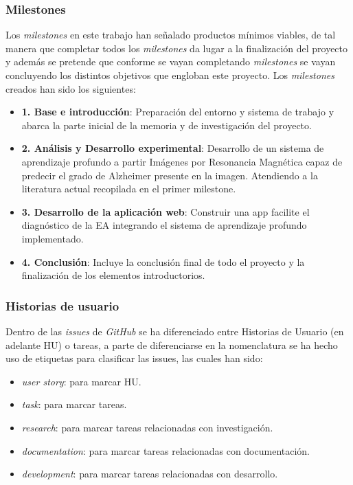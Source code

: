 \subsubsection{Milestones}
Los \textit{milestones} en este trabajo han señalado productos mínimos viables, de tal manera que completar todos los
\textit{milestones} da lugar a la finalización del proyecto y además se pretende que conforme se vayan completando
\textit{milestones} se vayan concluyendo los distintos objetivos que engloban este proyecto.
Los \textit{milestones} creados han sido los siguientes:
\begin{itemize}
    \item  \textbf{1. Base e introducción}: Preparación del entorno y sistema de trabajo y abarca la parte inicial de la
    memoria y de investigación del proyecto.
    \item \textbf{2. Análisis y Desarrollo experimental}: Desarrollo de un sistema de aprendizaje profundo a partir
    Imágenes por Resonancia Magnética capaz de predecir el grado de Alzheimer presente en la imagen.
    Atendiendo a la literatura actual recopilada en el primer milestone.
    \item \textbf{3. Desarrollo de la aplicación web}: Construir una app facilite  el diagnóstico de la EA integrando el
    sistema de aprendizaje profundo implementado.
    \item \textbf{4. Conclusión}: Incluye la conclusión final de todo el proyecto y la finalización de los elementos
    introductorios.\\
\end{itemize}

\subsubsection{Historias de usuario}
Dentro de las \textit{issues} de \textit{GitHub} se ha diferenciado entre Historias de Usuario (en adelante HU) o
tareas, a parte de diferenciarse en la nomenclatura se ha hecho uso de etiquetas para clasificar las issues,
las cuales han sido:

\begin{itemize}
    \item \textit{user story}: para marcar HU.
    \item \textit{task}: para marcar tareas.
    \item \textit{research}: para marcar tareas relacionadas con investigación.
    \item \textit{documentation}: para marcar tareas relacionadas con documentación.
    \item \textit{development}: para marcar tareas relacionadas con desarrollo. \\
\end{itemize}

